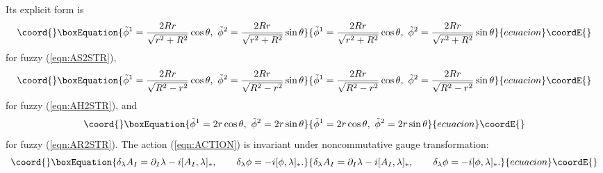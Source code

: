\documentclass[12pt,a4paper]{article}
\begin{document}
Its explicit form is 
\begin{equation}\coord{}\boxEquation{
{\tilde \phi}^1={2Rr\over\sqrt{r^2+R^2}}\cos \theta,\ {\tilde \phi}^2={2Rr\over\sqrt{r^2+R^2}}\sin \theta 
}{
{\tilde \phi}^1={2Rr\over\sqrt{r^2+R^2}}\cos \theta,\ {\tilde \phi}^2={2Rr\over\sqrt{r^2+R^2}}\sin \theta 
}{ecuacion}\coordE{}\end{equation}
for fuzzy \coordHE{} (\ref{eqn:AS2STR}),
\begin{equation}\coord{}\boxEquation{
{\tilde \phi}^1={2Rr\over\sqrt{R^2-r^2}}\cos \theta,\ {\tilde \phi}^2={2Rr\over\sqrt{R^2-r^2}}\sin \theta 
}{
{\tilde \phi}^1={2Rr\over\sqrt{R^2-r^2}}\cos \theta,\ {\tilde \phi}^2={2Rr\over\sqrt{R^2-r^2}}\sin \theta 
}{ecuacion}\coordE{}\end{equation}
for fuzzy \coordHE{} (\ref{eqn:AH2STR}), and
\begin{equation}\coord{}\boxEquation{
\label{eqn:PHIR2}
{\tilde \phi}^1=2r\cos \theta,\ {\tilde \phi}^2=2r\sin \theta 
}{
{\tilde \phi}^1=2r\cos \theta,\ {\tilde \phi}^2=2r\sin \theta 
}{ecuacion}\coordE{}\end{equation}
for fuzzy \coordHE{} (\ref{eqn:AR2STR}).
The action (\ref{eqn:ACTION}) is invariant under noncommutative \coordHE{} 
gauge transformation:
\begin{equation}\coord{}\boxEquation{
\delta_\lambda A_I=\partial_I\lambda-i[A_I,\lambda]_*,\quad\quad
\delta_\lambda\phi=-i[\phi,\lambda]_*.
}{
\delta_\lambda A_I=\partial_I\lambda-i[A_I,\lambda]_*,\quad\quad
\delta_\lambda\phi=-i[\phi,\lambda]_*.
}{ecuacion}\coordE{}\end{equation}
\end{document}
